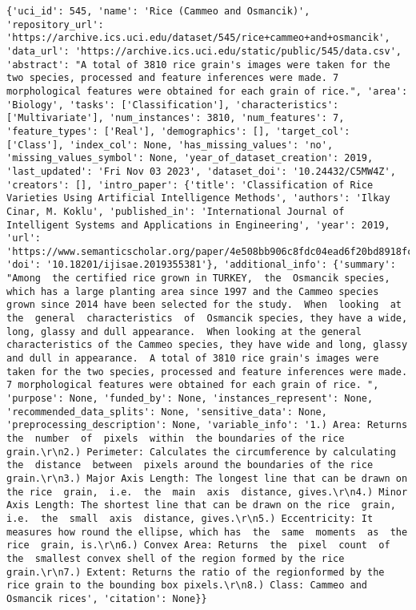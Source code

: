 \documentclass[
  letterpaper,
]{krantz}
\begin{document}
\begin{verbatim}
{'uci_id': 545, 'name': 'Rice (Cammeo and Osmancik)', 'repository_url': 'https://archive.ics.uci.edu/dataset/545/rice+cammeo+and+osmancik', 'data_url': 'https://archive.ics.uci.edu/static/public/545/data.csv', 'abstract': "A total of 3810 rice grain's images were taken for the two species, processed and feature inferences were made. 7 morphological features were obtained for each grain of rice.", 'area': 'Biology', 'tasks': ['Classification'], 'characteristics': ['Multivariate'], 'num_instances': 3810, 'num_features': 7, 'feature_types': ['Real'], 'demographics': [], 'target_col': ['Class'], 'index_col': None, 'has_missing_values': 'no', 'missing_values_symbol': None, 'year_of_dataset_creation': 2019, 'last_updated': 'Fri Nov 03 2023', 'dataset_doi': '10.24432/C5MW4Z', 'creators': [], 'intro_paper': {'title': 'Classification of Rice Varieties Using Artificial Intelligence Methods', 'authors': 'Ilkay Cinar, M. Koklu', 'published_in': 'International Journal of Intelligent Systems and Applications in Engineering', 'year': 2019, 'url': 'https://www.semanticscholar.org/paper/4e508bb906c8fdc04ead6f20bd8918fcb3605d1c', 'doi': '10.18201/ijisae.2019355381'}, 'additional_info': {'summary': "Among  the certified rice grown in TURKEY,  the  Osmancik species, which has a large planting area since 1997 and the Cammeo species grown since 2014 have been selected for the study.  When  looking  at  the  general  characteristics  of  Osmancik species, they have a wide, long, glassy and dull appearance.  When looking at the general characteristics of the Cammeo species, they have wide and long, glassy and dull in appearance.  A total of 3810 rice grain's images were taken for the two species, processed and feature inferences were made. 7 morphological features were obtained for each grain of rice. ", 'purpose': None, 'funded_by': None, 'instances_represent': None, 'recommended_data_splits': None, 'sensitive_data': None, 'preprocessing_description': None, 'variable_info': '1.) Area: Returns  the  number  of  pixels  within  the boundaries of the rice grain.\r\n2.) Perimeter: Calculates the circumference by calculating  the  distance  between  pixels around the boundaries of the rice grain.\r\n3.) Major Axis Length: The longest line that can be drawn on the rice  grain,  i.e.  the  main  axis  distance, gives.\r\n4.) Minor Axis Length: The shortest line that can be drawn on the rice  grain,  i.e.  the  small  axis  distance, gives.\r\n5.) Eccentricity: It measures how round the ellipse, which has  the  same  moments  as  the  rice  grain, is.\r\n6.) Convex Area: Returns  the  pixel  count  of  the  smallest convex shell of the region formed by the rice grain.\r\n7.) Extent: Returns the ratio of the regionformed by the rice grain to the bounding box pixels.\r\n8.) Class: Cammeo and Osmancik rices', 'citation': None}}

\end{verbatim}
\end{document}
